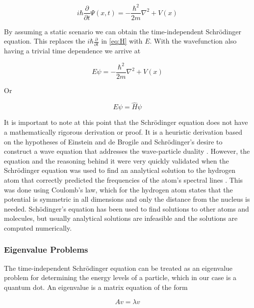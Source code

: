 \documentclass[authoryearcitations]{UoYCSproject}
\begin{document}
\begin{equation}
i\hbar\frac{\partial}{\partial t}\Psi (x,t) = -\frac{\hbar ^2}{2m}\nabla ^2 + V(x)
\label{eq:H}
\end{equation}

By assuming a static scenario we can obtain the time-independent Schr\"{o}dinger equation. This replaces
the $i\hbar \frac{\partial}{\partial t}$ in \ref{eq:H} with $E$. With the wavefunction also having a trivial time
dependence we arrive at

\begin{equation}
E\psi = -\frac{\hbar ^2}{2m}\nabla ^2 + V(x) 
\label{eq:timeIndependent}
\end{equation}


Or

\begin{equation}
E\psi = \hat{H}\psi  
\label{eq:eigenSchrodinger}
\end{equation}

It is important to note at this point that the Schr\"{o}dinger equation does not have a mathematically rigorous 
derivation or proof. It is a heuristic derivation based on the hypotheses of Einstein and de Brogile and Schr\"{o}dinger's
desire to construct a wave equation that addresses the wave-particle duality \cite{ricardo, qp}. %
However, the equation and the reasoning behind it were very quickly validated when the Schr\"{o}dinger equation was used
to find an analytical solution to the hydrogen atom that correctly predicted the frequencies of the atom's spectral lines
\cite{qp}. This was done using Coulomb's law, which for the hydrogen atom states that the potential is symmetric in all dimensions
and only the distance from the nucleus is needed. Sch\"{o}dinger's equation has been used to find solutions to other atoms and
molecules, but usually analytical solutions are infeasible and the solutions are computed numerically. 


\subsubsection{Eigenvalue Problems}
\label{eigenvalueproblems}
The time-independent Schr\"{o}dinger equation can be treated as an eigenvalue problem for determining the energy levels
of a particle, which in our case is a quantum dot. An eigenvalue is a matrix equation of the form

\begin{equation}
Av = \lambda v
\label{eq:eigenDef}
\end{equation}
\end{document}
